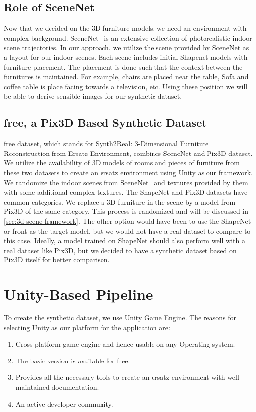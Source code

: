\subsection{Role of SceneNet}\label{sec:role-of-scenenet}
Now that we decided on the 3D furniture models, we need an environment with complex background.
SceneNet~\cite{McCormac2017} is an extensive collection of photorealistic indoor scene trajectories.
In our approach, we utilize the scene provided by SceneNet as a layout for our indoor scenes.
Each scene includes initial Shapenet models with furniture placement.
The placement is done such that the context between the furnitures is maintained.
For example, chairs are placed near the table,
Sofa and coffee table is place facing towards a television, etc.
Using these position we will be able to derive sensible images for our synthetic dataset.

\subsection{\gls{free}, a Pix3D Based Synthetic Dataset}\label{sec:s2r:3d-free-a-pix3d-based-synthetic-dataset}

\gls{free} dataset, which stands for Synth2Real: 3-Dimensional Furniture Reconstruction from Ersatz Environment, combines SceneNet and Pix3D dataset.
We utilize the availability of 3D models of rooms and pieces of furniture from these two datasets to create an ersatz environment using Unity as our framework.
We randomize the indoor scenes from SceneNet~\cite{McCormac2017} and textures provided by them with some additional complex textures.
The ShapeNet and Pix3D datasets have common categories.
We replace a 3D furniture in the scene by a model from Pix3D of the same category.
This process is randomized and will be discussed in \autoref{sec:3d-scene-framework}.
The other option would have been to use the ShapeNet or \gls{front} as the target model, but we would not have a real dataset to compare to this case.
Ideally, a model trained on ShapeNet should also perform well with a real dataset like Pix3D, but we decided to have a synthetic dataset based on Pix3D itself for better comparison.

\section{Unity-Based Pipeline}\label{sec:unity-based-pipeline}
To create the synthetic dataset, we use Unity Game Engine.
The reasons for selecting Unity as our platform for the application are:
\begin{enumerate}
    \item Cross-platform game engine and hence usable on any Operating system.
    \item The basic version is available for free.
    \item Provides all the necessary tools to create an ersatz environment with well-maintained documentation.
    \item An active developer community.
\end{enumerate}

